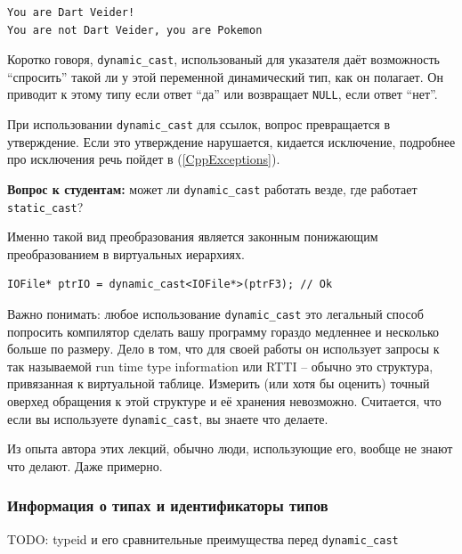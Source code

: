 \documentclass[a4paper,12pt,oneside]{article}
\newif\ifanswers
\begin{document}
\begin{verbatim}
You are Dart Veider!
You are not Dart Veider, you are Pokemon
\end{verbatim}

Коротко говоря, \lstinline!dynamic_cast!, использованый для указателя даёт возможность ``спросить'' такой ли у этой переменной динамический тип, как он полагает. Он приводит к этому типу если ответ ``да'' или возвращает \lstinline!NULL!, если ответ ``нет''.

При использовании \lstinline!dynamic_cast! для ссылок, вопрос превращается в утверждение. Если это утверждение нарушается, кидается исключение, подробнее про исключения речь пойдет в (\ref{CppExceptions}).

\textbf{Вопрос к студентам:} может ли \lstinline!dynamic_cast! работать везде, где работает \lstinline!static_cast!?

\ifanswers
Правильный ответ: нет \lstinline!dynamic_cast! очень важно, чтобы в базовом классе была хотя бы одна виртуальная функция -- если таблицы виртуальных методов не будет существовать, динамическое приведение не будет работать.
\fi

Именно такой вид преобразования является законным понижающим преобразованием в виртуальных иерархиях.

\begin{lstlisting}
IOFile* ptrIO = dynamic_cast<IOFile*>(ptrF3); // Ok
\end{lstlisting}

Важно понимать: любое использование \lstinline!dynamic_cast! это легальный способ попросить компилятор сделать вашу программу гораздо медленнее и несколько больше по размеру. Дело в том, что для своей работы он использует запросы к так называемой run time type information или RTTI -- обычно это структура, привязанная к виртуальной таблице. Измерить (или хотя бы оценить) точный оверхед обращения к этой структуре и её хранения невозможно. Считается, что если вы используете \lstinline!dynamic_cast!, вы знаете что делаете.

Из опыта автора этих лекций, обычно люди, использующие его, вообще не знают что делают. Даже примерно.

\subsubsection{Информация о типах и идентификаторы типов}\label{TypeInfo}

TODO: typeid и его сравнительные преимущества перед \lstinline!dynamic_cast!
\end{document}
